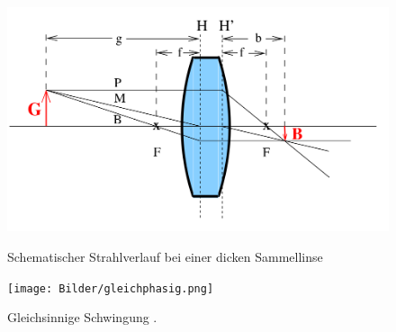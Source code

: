\begin{figure}
  \caption{Schematischer Strahlverlauf bei einer dicken Sammellinse \cite{Anleitung}}
  \includegraphics{Bilder/fettelinse.png}
  \label{fig:diefette}
\end{figure}


\begin{figure}
	\centering
	\texttt{[image: Bilder/gleichphasig.png]}
	\caption{Gleichsinnige Schwingung \cite{Anleitung}.}
	\label{fig:gleich}
\end{figure}
\FloatBarrier
